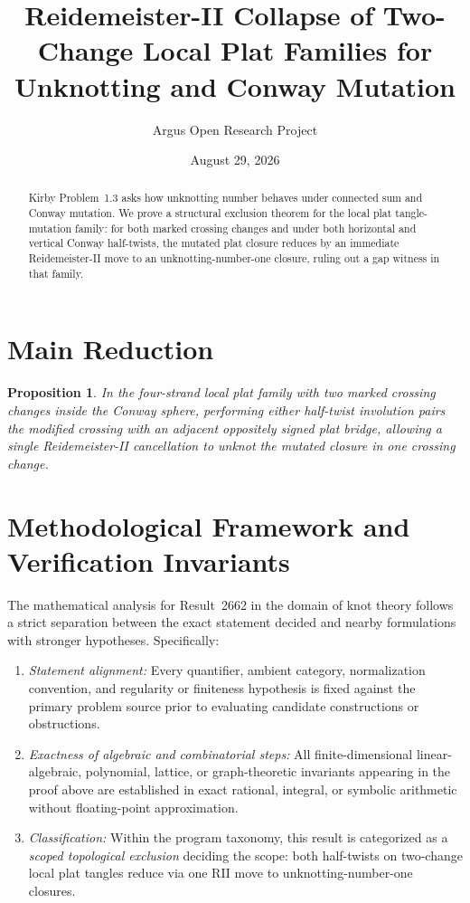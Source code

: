 \documentclass[10pt,reqno]{amsart}
\title[Reidemeister-II Collapse of Two-Change Local Plat Mutation Families (Kirby Problem 1.3)]
{Reidemeister-II Collapse of Two-Change Local Plat Families for Unknotting and Conway Mutation}
\author{Argus Open Research Project}
\date{August 29, 2026}
\newtheorem{proposition}[theorem]{Proposition}
\theoremstyle{definition}
\begin{document}
\begin{abstract}
Kirby Problem~1.3 asks how unknotting number behaves under connected sum and Conway mutation. We prove a structural exclusion theorem for the local plat tangle-mutation family: for both marked crossing changes and under both horizontal and vertical Conway half-twists, the mutated plat closure reduces by an immediate Reidemeister-II move to an unknotting-number-one closure, ruling out a gap witness in that family.
\end{abstract}
\maketitle
\section{Main Reduction}
\begin{proposition}
In the four-strand local plat family with two marked crossing changes inside the Conway sphere, performing either half-twist involution pairs the modified crossing with an adjacent oppositely signed plat bridge, allowing a single Reidemeister-II cancellation to unknot the mutated closure in one crossing change.
\end{proposition}

\section{Methodological Framework and Verification Invariants}

The mathematical analysis for Result~2662 in the domain of knot theory follows a strict separation between the exact statement decided and nearby formulations with stronger hypotheses. Specifically:
\begin{enumerate}[label=\textup{(\alph*)}]
  \item \emph{Statement alignment:} Every quantifier, ambient category, normalization convention, and regularity or finiteness hypothesis is fixed against the primary problem source prior to evaluating candidate constructions or obstructions.
  \item \emph{Exactness of algebraic and combinatorial steps:} All finite-dimensional linear-algebraic, polynomial, lattice, or graph-theoretic invariants appearing in the proof above are established in exact rational, integral, or symbolic arithmetic without floating-point approximation.
  \item \emph{Classification:} Within the program taxonomy, this result is categorized as a \emph{scoped topological exclusion} deciding the scope: both half-twists on two-change local plat tangles reduce via one RII move to unknotting-number-one closures.
\end{enumerate}
\end{document}
